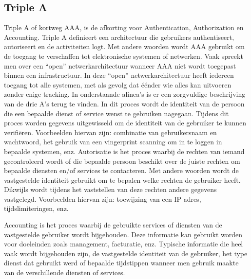 \subsection{Triple A }
Triple A of kortweg AAA, is de afkorting voor Authentication, Authorization en Accounting. Triple A definieert een architectuur die gebruikers authentiseert, autoriseert en de activiteiten logt. Met andere woorden wordt AAA gebruikt om de toegang te verschaffen tot elektronische systemen of netwerken.
\newline
\newline
Vaak spreekt men over een “open” netwerkarchitectuur wanneer AAA niet wordt toegepast binnen een infrastructuur. In deze “open” netwerkarchitectuur heeft iedereen toegang tot alle systemen, met als gevolg dat éénder wie alles kan uitvoeren zonder enige tracking.
\newline
\newline
In onderstaande alinea’s is er een zorgvuldige beschrijving van de drie A’s terug te vinden.
\newline
In dit proces wordt de identiteit van de persoon die een bepaalde dienst of service wenst te gebruiken nagegaan. Tijdens dit proces worden gegevens uitgewisseld om de identiteit van de gebruiker te kunnen verifiëren. Voorbeelden hiervan zijn: combinatie van gebruikersnaam en wachtwoord, het gebruik van een vingerprint scanning om in te loggen in bepaalde systemen, enz.
\newpage
{}
\newline 
Autorisatie is het proces waarbij de rechten van iemand gecontroleerd wordt of die bepaalde persoon beschikt over de juiste rechten om bepaalde diensten en/of services te contacteren. Met andere woorden wordt de vastgestelde identiteit gebruikt om te bepalen welke rechten de gebruiker heeft. Dikwijls wordt tijdens het vaststellen van deze rechten andere gegevens vastgelegd. Voorbeelden hiervan zijn: toewijzing van een IP adres, tijdslimiteringen, enz.

\newline
Accounting is het proces waarbij de gebruikte services of diensten van de vastgestelde gebruiker wordt bijgehouden. Deze informatie kan gebruikt worden voor doeleinden zoals management, facturatie, enz. Typische informatie die heel vaak wordt bijgehouden zijn, de vastgestelde identiteit van de gebruiker, het type dienst dat gebruikt werd of bepaalde tijdstippen wanneer men gebruik maakte van de verschillende diensten of services. 

